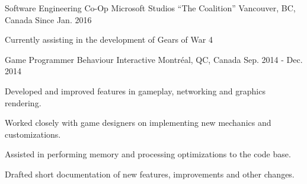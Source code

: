 

\begin{cventries}

  \cventry
    {Software Engineering Co-Op} %
    {Microsoft Studios ``The Coalition''} %
    {Vancouver, BC, Canada} %
    {Since Jan. 2016} %
    {
      \begin{cvitems} %
        \item {Currently assisting in the development of Gears of War 4}
        \\
      \end{cvitems}
    }
    \vspace{2.0mm}

  \cventry
    {Game Programmer} %
    {Behaviour Interactive} %
    {Montréal, QC, Canada} %
    {Sep. 2014 - Dec. 2014} %
    {
      \begin{cvitems} %
        \item {Developed and improved features in gameplay, networking and graphics rendering.}
        \item {Worked closely with game designers on implementing new mechanics and customizations.}
        \item {Assisted in performing memory and processing optimizations to the code base.}
        \item {Drafted short documentation of new features, improvements and other changes.}
        \\
      \end{cvitems}
    }

\end{cventries}
